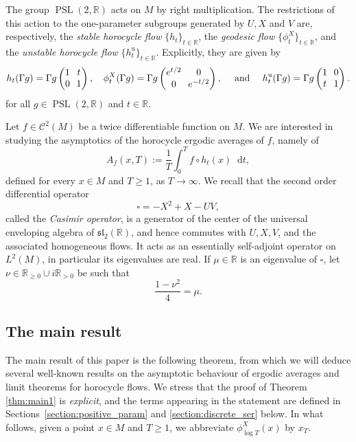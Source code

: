 \documentclass[10pt]{amsart}
\newcommand \R{\mathbb{R}}
\newcommand*{\diff}{\mathop{}\!\mathrm{d}}
\newcommand{\aver}[1]{A_{#1}(x,T)}
\DeclareMathOperator{\PSL}{PSL}
\DeclareMathOperator{\un}{u}
\theoremstyle{definition}
\begin{document}
The group $\PSL(2,\R)$ acts on $M$ by right multiplication.
The restrictions of this action to the one-parameter subgroups generated by $U, X$ and $V$ are, respectively, the \emph{stable horocycle flow} $\{h_t\}_{t \in \R}$, the \emph{geodesic flow} $\{\phi^X_t\}_{t \in \R}$, and the \emph{unstable horocycle flow} $\{h^{\un}_t\}_{t \in \R}$.
Explicitly, they are given by\enlargethispage{.5\baselineskip}
\[\arraycolsep3.5pt
h_t(\Gamma g) = \Gamma g
\begin{pmatrix}
1 & t \\
0 & 1
\end{pmatrix},
\quad
\phi^X_t(\Gamma g) = \Gamma g
\begin{pmatrix}
e^{t/2} & 0 \\
0 & e^{-t/2}
\end{pmatrix},
\quad \text{ and } \quad
h^{\un}_t(\Gamma g) = \Gamma g
\begin{pmatrix}
1 & 0 \\
t & 1
\end{pmatrix}.
\]
for all $g \in \PSL(2,\R)$ and $t \in \R$.

Let $f \in \mathscr{C}^2(M)$ be a twice differentiable function on $M$.
We are interested in studying the asymptotics of the horocycle ergodic averages of $f$, namely of\vspace*{-3pt}
\[
\aver{f} := \frac{1}{T} \int_0^T f \circ h_t (x) \diff t,
\]
defined for every $x \in M$ and $T \geq 1$, as $T \to \infty$.
We recall that the second order differential operator\vspace*{-3pt}
\[
\square = -X^2+X-UV,
\]
called the \emph{Casimir operator}, is a generator of the center of the universal enveloping algebra of $\mathfrak{sl}_2(\R)$, and hence commutes with $U, X, V$, and the associated homogeneous flows.
It acts as an essentially self-adjoint operator on $L^2(M)$, in particular its eigenvalues are real.
If $\mu \in\R$ is an eigenvalue of $\square$, let $\nu \in \R_{\geq 0 } \cup i \R_{>0}$ be such that\vspace*{-3pt}
\[
\frac{1-\nu^2}{4} = \mu.
\]

\subsection{The main result}

The main result of this paper is the following theorem, from which we will deduce several well-known results on the asymptotic behaviour of ergodic averages and limit theorems for horocycle flows.
We stress that the proof of Theorem \ref{thm:main1} is \emph{explicit}, and the terms appearing in the statement are defined in Sections~\ref{section:positive_param} and \ref{section:discrete_ser} below.
In what follows, given a point $x\in M$ and $T\geq 1$, we abbreviate $\phi^X_{\log T}(x)$ by $x_T$.
\end{document}
